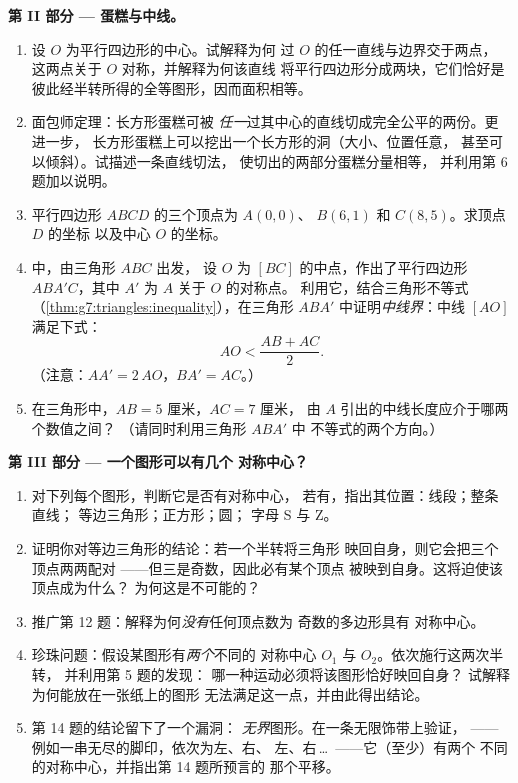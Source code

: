 \begin{problem}
\medskip
\noindent\textbf{第 II 部分 --- 蛋糕与中线。}
\begin{enumerate}[resume]
  \item 设 $O$ 为平行四边形的中心。试解释为何
        过 $O$ 的任一直线与边界交于两点，
        这两点关于 $O$ 对称，并解释为何该直线
        将平行四边形分成两块，它们恰好是
        彼此经半转所得的全等图形，因而面积相等。
  \item 面包师定理：长方形蛋糕可被
        \emph{任一}过其中心的直线切成完全公平的两份。更进一步，
        长方形蛋糕上可以挖出一个长方形的洞（大小、位置任意，
        甚至可以倾斜）。试描述一条直线切法，
        使切出的两部分蛋糕分量相等，
        并利用第 6 题加以说明。
  \item 平行四边形 $ABCD$ 的三个顶点为 $A(0, 0)$、
        $B(6, 1)$ 和 $C(8, 5)$。求顶点 $D$ 的坐标
        以及中心 $O$ 的坐标。
  \item {}中，由三角形 $ABC$ 出发，
        设 $O$ 为 $[BC]$ 的中点，作出了平行四边形
        $ABA'C$，其中 $A'$ 为 $A$ 关于 $O$ 的对称点。
        利用它，结合三角形不等式
        （\cref{thm:g7:triangles:inequality}），在三角形
        $ABA'$ 中证明\emph{中线界}：中线
        $[AO]$ 满足下式：
        \[
        AO < \frac{AB + AC}{2} .
        \]
        （注意：$AA' = 2\,AO$，$BA' = AC$。）
  \item 在三角形中，$AB = 5$ 厘米，$AC = 7$ 厘米，
        由 $A$ 引出的中线长度应介于哪两个数值之间？
        （请同时利用三角形 $ABA'$ 中
        不等式的两个方向。）
\end{enumerate}

\medskip
\noindent\textbf{第 III 部分 --- 一个图形可以有几个
对称中心？}
\begin{enumerate}[resume]
  \item 对下列每个图形，判断它是否有对称中心，
        若有，指出其位置：线段；整条直线；
        等边三角形；正方形；圆；
        字母 S 与 Z。
  \item 证明你对等边三角形的结论：若一个半转将三角形
        映回自身，则它会把三个顶点两两配对
        ——但三是奇数，因此必有某个顶点
        被映到自身。这将迫使该顶点成为什么？
        为何这是不可能的？
  \item 推广第 12 题：解释为何\emph{没有}任何顶点数为
        奇数的多边形具有
        对称中心。
  \item 珍珠问题：假设某图形有\emph{两个}不同的
        对称中心 $O_1$ 与 $O_2$。依次施行这两次半转，
        并利用第 5 题的发现：
        哪一种运动必须将该图形恰好映回自身？
        试解释为何能放在一张纸上的图形
        无法满足这一点，并由此得出结论。
  \item 第 14 题的结论留下了一个漏洞：
        \emph{无界}图形。在一条无限饰带上验证，
        ——例如一串无尽的脚印，依次为左、右、
        左、右\,\dots\ ——它（至少）有两个
        不同的对称中心，并指出第 14 题所预言的
        那个平移。
\end{enumerate}
\end{problem}

